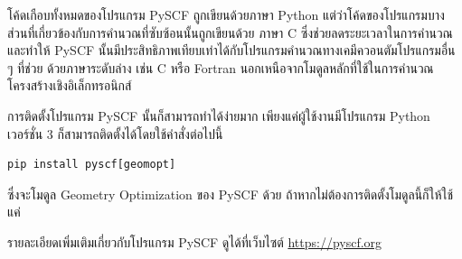 โค้ดเกือบทั้งหมดของโปรแกรม PySCF ถูกเขียนด้วยภาษา Python แต่ว่าโค้ดของโปรแกรมบางส่วนที่เกี่ยวข้องกับการคำนวณที่ซับซ้อนนั้นถูกเขียนด้วย%
ภาษา C ซึ่งช่วยลดระยะเวลาในการคำนวณและทำให้ PySCF นั้นมีประสิทธิภาพเทียบเท่าได้กับโปรแกรมคำนวณทางเคมีควอนตัมโปรแกรมอื่น ๆ ที่ช่วย%
ด้วยภาษาระดับล่าง เช่น C หรือ Fortran นอกเหนือจากโมดูลหลักที่ใช้ในการคำนวณโครงสร้างเชิงอิเล็กทรอนิกส์

การติดตั้งโปรแกรม PySCF นั้นก็สามารถทำได้ง่ายมาก เพียงแค่ผู้ใช้งานมีโปรแกรม Python เวอร์ชั่น 3 ก็สามารถติดตั้งได้โดยใช้คำสั่งต่อไปนี้

\begin{lstlisting}[style=MyBash]
pip install pyscf[geomopt]
\end{lstlisting}

\vspace{1em}
\noindent ซึ่งจะโมดูล Geometry Optimization ของ PySCF ด้วย ถ้าหากไม่ต้องการติดตั้งโมดูลนี้ก็ให้ใช้แค่ 

รายละเอียดเพิ่มเติมเกี่ยวกับโปรแกรม PySCF ดูได้ที่เว็บไซต์ \url{https://pyscf.org}
